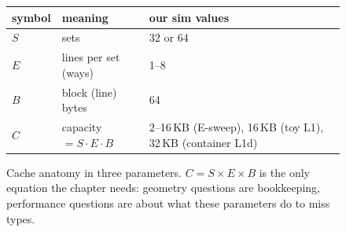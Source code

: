 \begin{figure}[htbp]
\centering
\begin{tabular}{llp{5.5cm}}
\toprule
symbol & meaning & our sim values \\
\midrule
$S$ & sets          & 32 or 64 \\
$E$ & lines per set (ways) & 1--8 \\
$B$ & block (line) bytes   & 64 \\
\midrule
$C$ & capacity $=S\cdot E\cdot B$ & 2--16\,KB (E-sweep), 16\,KB (toy L1), 32\,KB (container L1d) \\
\bottomrule
\end{tabular}
\caption{Cache anatomy in three parameters. $C=S\times E\times B$ is
the only equation the chapter needs: geometry questions are
bookkeeping, performance questions are about what these parameters
do to miss types.}
\label{fig:anatomy10}
\end{figure}
